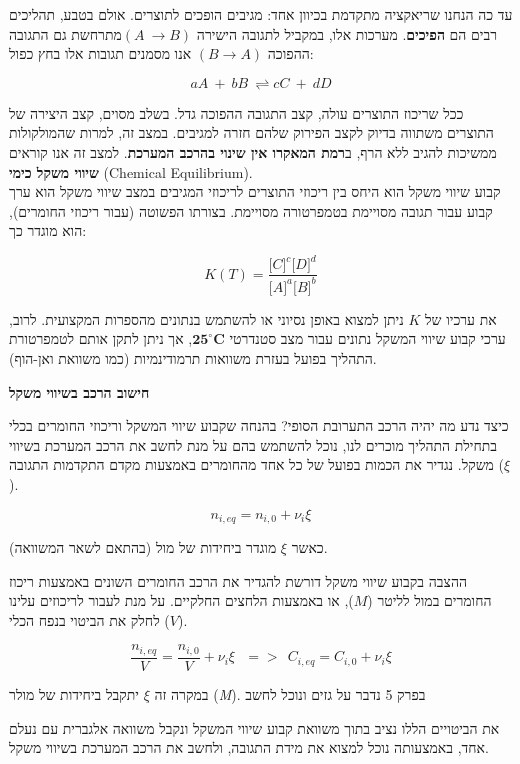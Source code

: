 \documentclass[
  hebrew,
  letterpaper,
  DIV=11,
  numbers=noendperiod]{scrreprt}
\begin{document}
עד כה הנחנו שריאקציה מתקדמת בכיוון אחד: מגיבים הופכים לתוצרים. אולם
בטבע, תהליכים רבים הם \textbf{הפיכים}. מערכות אלו, במקביל לתגובה הישירה
\((A\  \rightarrow B)\)מתרחשת גם התגובה ההפוכה \((B \rightarrow A)\) אנו
מסמנים תגובות אלו בחץ כפול:

\[aA\  + \ bB\  \rightleftharpoons cC\  + \ dD\]

ככל שריכוז התוצרים עולה, קצב התגובה ההפוכה גדל. בשלב מסוים, קצב היצירה
של התוצרים משתווה בדיוק לקצב הפירוק שלהם חזרה למגיבים. במצב זה, למרות
שהמולקולות ממשיכות להגיב ללא הרף, ב\textbf{רמת המאקרו אין שינוי בהרכב
המערכת}. למצב זה אנו קוראים \textbf{שיווי משקל כימי} (Chemical
Equilibrium).\\

קבוע שיווי משקל הוא היחס בין ריכוזי התוצרים לריכוזי המגיבים במצב שיווי
משקל הוא ערך קבוע עבור תגובה מסויימת בטמפרטורה מסויימת. בצורתו הפשוטה
(עבור ריכוזי החומרים), הוא מוגדר כך:

\[K(T) = \frac{\lbrack C\rbrack^{c}\lbrack D\rbrack^{d}}{\lbrack A\rbrack^{a}\lbrack B\rbrack^{b}}\]

את ערכיו של \(K\) ניתן למצוא באופן נסיוני או להשתמש בנתונים מהספרות
המקצועית. לרוב, ערכי קבוע שיווי המשקל נתונים עבור מצב סטנדרטי
\(\mathbf{2}\mathbf{5}^{\mathbf{\circ}}\mathbf{C}\), אך ניתן לתקן אותם
לטמפרטורת התהליך בפועל בעזרת משוואות תרמודינמיות (כמו משוואת ואן-הוף).

\textbf{חישוב הרכב בשיווי משקל}

כיצד נדע מה יהיה הרכב התערובת הסופי? בהנחה שקבוע שיווי המשקל וריכוזי
החומרים בכלי בתחילת התהליך מוכרים לנו, נוכל להשתמש בהם על מנת לחשב את
הרכב המערכת בשיווי משקל. נגדיר את הכמות בפועל של כל אחד מהחומרים באמצעות
מקדם התקדמות התגובה (\(\xi\)).

\[n_{i,eq} = n_{i,0} + \nu_{i}\xi\]

כאשר \(\xi\) מוגדר ביחידות של מול (בהתאם לשאר המשוואה).

ההצבה בקבוע שיווי משקל דורשת להגדיר את הרכב החומרים השונים באמצעות ריכוז
החומרים במול לליטר (\(M\)), או באמצעות הלחצים החלקיים. על מנת לעבור
לריכוזים עלינו לחלק את הביטוי בנפח הכלי (\(V\)).

\[\frac{n_{i,eq}}{V} = \frac{n_{i,0}}{V} + \nu_{i}\xi\ \ \  = > \ \ C_{i,eq} = C_{i,0} + \nu_{i}\xi\]

במקרה זה \(\xi\) יתקבל ביחידות של מולר (\emph{M}). בפרק 5 נדבר על גזים
ונוכל לחשב

את הביטויים הללו נציב בתוך משוואת קבוע שיווי המשקל ונקבל משוואה אלגברית
עם נעלם אחד, באמצעותה נוכל למצוא את מידת התגובה, ולחשב את הרכב המערכת
בשיווי משקל.
\end{document}
